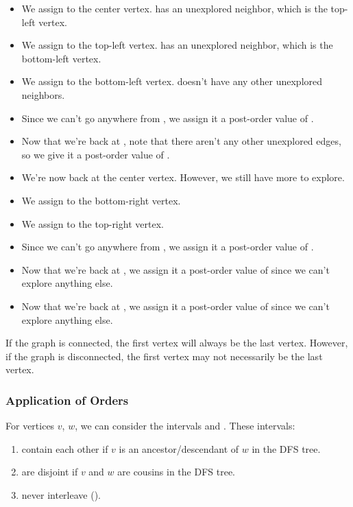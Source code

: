 \documentclass[letterpaper]{article}
\begin{document}
\begin{itemize}
    \item We assign  to the center vertex.  has an unexplored neighbor, which is the top-left vertex.
    \item We assign  to the top-left vertex.  has an unexplored neighbor, which is the bottom-left vertex. 
    \item We assign  to the bottom-left vertex.  doesn't have any other unexplored neighbors.  
    \item Since we can't go anywhere from , we assign it a post-order value of .
    \item Now that we're back at , note that there aren't any other unexplored edges, so we give it a post-order value of .
    \item We're now back at the center vertex. However, we still have more to explore.
    \item We assign  to the bottom-right vertex. 
    \item We assign  to the top-right vertex. 
    \item Since we can't go anywhere from , we assign it a post-order value of .
    \item Now that we're back at , we assign it a post-order value of  since we can't explore anything else.
    \item Now that we're back at , we assign it a post-order value of  since we can't explore anything else. 
\end{itemize}
If the graph is connected, the first vertex will always be the last vertex. However, if the graph is disconnected, the first vertex may not necessarily be the last vertex. 

\subsubsection{Application of Orders}
\begin{proposition}
    For vertices $v$, $w$, we can consider the intervals  and . These intervals:
    \begin{enumerate}
        \item contain each other if $v$ is an ancestor/descendant of $w$ in the DFS tree. 
        \item are disjoint if $v$ and $w$ are cousins in the DFS tree.
        \item never interleave ().
    \end{enumerate}
\end{proposition}
\end{document}
